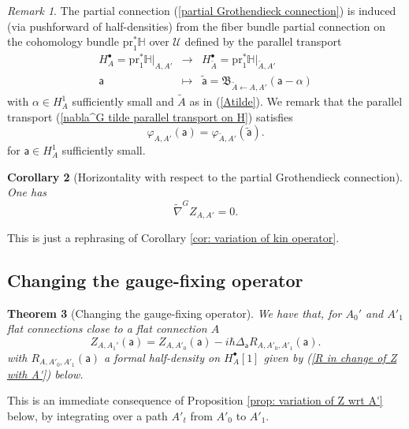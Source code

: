 \documentclass[11pt,a4paper]{amsart}
\theoremstyle{plain} %
\newtheorem{thm}{Theorem}[section]
\newtheorem{cor}[thm]{Corollary}
\theoremstyle{definition}
\theoremstyle{remark}
\newtheorem{rem}[thm]{Remark}
\newcommand{\mr}{\mathrm}
\newcommand{\sfa}{\mathsf{a}}
\newcommand{\bt}{\bullet}
\newcommand{\ra}{\rightarrow}
\newcommand{\til}{\widetilde}
\newcommand{\mc}{\mathcal}
\newcommand{\la}{\leftarrow}
\begin{document}
{%
\begin{rem}\label{rem: partial Grothendieck connection}
The partial connection (\ref{partial Grothendieck connection}) is induced (via pushforward of half-densities) from the fiber bundle partial connection on the cohomology bundle $\mr{pr}_1^* \mathbb{H}$ over $\mc{U}$ 
defined by the parallel transport
\begin{equation}\label{nabla^G tilde parallel transport on H}
\begin{array}{ccc}
    H_A^\bt=\mr{pr}_1^* \mathbb{H}|_{A,A'} & \ra & H^\bt_{\til{A}}=\mr{pr}_1^* \mathbb{H}|_{\til{A},A'} \\
    \sfa& \mapsto & \til{\sfa}=\mathfrak{B}_{\til{A}\la A,A'} (\sfa-\alpha)
\end{array}
\end{equation}
with $\alpha\in H^1_A$ sufficiently small and $\til{A}$ as in (\ref{Atilde}). We remark that the parallel transport (\ref{nabla^G tilde parallel transport on H}) satisfies
\begin{equation}\label{rem: partial Grothendieck connection eq1}
    \varphi_{A,A'}(\sfa)=\varphi_{\til{A},A'}(\til{\sfa}).
\end{equation}
for $\sfa\in H^1_A$ sufficiently small.
\end{rem}

\begin{cor}[Horizontality with respect to the partial Grothendieck connection] 
\label{cor: horizontality wrt nabla_G}
One has
        \begin{equation}
            \widetilde{\nabla}^G Z_{A,A'} = 0. 
        \end{equation}
\end{cor}
This is just a rephrasing of Corollary \ref{cor: variation of kin operator}.



\subsection{Changing the gauge-fixing operator}
\begin{thm}[Changing the gauge-fixing operator]\label{thm: change gf}
We have that, for $A_0'$ and $A'_1$ flat connections close to a flat connection $A$ 
        \begin{equation}\label{thm change of A' eq}
            Z_{A,A_1'}(\sfa) = %
            Z_{A,A'_0}(\sfa) -i\hbar \Delta_\sfa R_{A,A'_0,A'_1}(\sfa). 
        \end{equation}
        with $R_{A,A'_0,A'_1}(\sfa)$ a formal half-density on $H^\bt_A[1]$ given by (\ref{R in change of Z with A'}) below. 
\end{thm}
This is an immediate consequence of Proposition \ref{prop: variation of Z wrt A'} below, by integrating over a path $A'_t$ from $A'_0$ to $A'_1$.

}
\end{document}
